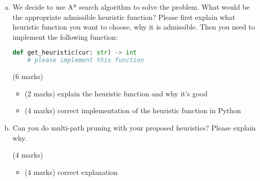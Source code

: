\documentclass[12pt]{article}
\begin{document}
\begin{enumerate}[(a)]
\begin{lstlisting}[language=python]
def ids_search() -> int:
    depth = 1
    # please complete this function
\end{lstlisting}

          \begin{markscheme} (8 marks)
              \begin{itemize}
                  \item
                        (4 marks) correctly implement the IDS search algorithm in Python
                  \item
                        (2 marks) correctly answer questions about IDS completeness
                  \item
                        (2 marks) correctly answer the space complexity.
              \end{itemize}
          \end{markscheme}

    \item
          We decide to use A* search algorithm to solve the problem. What would be the appropriate admissible heuristic function? Please first explain what heuristic function you want to choose, why it is admissible. Then you need to implement the following function:
          \begin{lstlisting}[language=python]
def get_heuristic(cur: str) -> int
    # please implement this function
\end{lstlisting}

          \begin{markscheme} (6 marks)
              \begin{itemize}
                  \item
                        (2 marks) explain the heuristic function and why it's good
                  \item
                        (4 marks) correct implementation of the heuristic function in Python
              \end{itemize}

          \end{markscheme}

    \item
          Can you do multi-path pruning with your proposed heuristics? Please explain why.
          \begin{markscheme} (4 marks)
              \begin{itemize}
                  \item (4 marks) correct explanation
              \end{itemize}
          \end{markscheme}


\end{enumerate}
\end{document}
